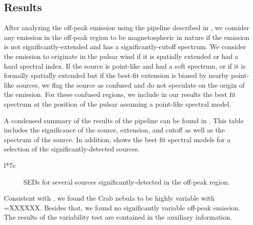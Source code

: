 \subsection{Results}

After analyzing the off-peak emission using the pipeline described
in , we consider any emission in the
off-peak region to be magnetospheric in nature if the emission is
not significantly-extended and has a significantly-cutoff spectrum.
We consider the emission to originate in the pulsar wind if it is
spatially extended or had a hard spectral index.  If the source is
point-like and had a soft spectrum, or if it is formally spatially
extended but if the best-fit extension is biased by nearby point-like
sources, we flag the source as confused and do not speculate on the
origin of the emission.  For these confused regions, we include in our
results the best fit spectrum at the position of the pulsar assuming a
point-like spectral model.

A condensed summary of the results of the pipeline can be found in
. This table includes the significance of the source,
extension, and cutoff as well as the spectrum of the source.
In addition,  shows the best fit spectral
models for a selection of the significantly-detected sources.


\begin{deluxetable}{l*{7}c}
\tabletypesize{\scriptsize}

\end{deluxetable}


\begin{figure}
  \ifdefined\bwfigures
  \else
  \fi
  \caption{SEDs for several sources significantly-detected in the off-peak region.}
  \label{fig:seds_test}
\end{figure}


Consistent with \citep{LAT_Collaboration_Crab_Flare_2011}, we found
the Crab nebula to be highly variable with \tsvar=XXXXXX.  Besides that,
we found no significantly variable off-peak emission.  The results of
the variability test are contained in the auxiliary information.

